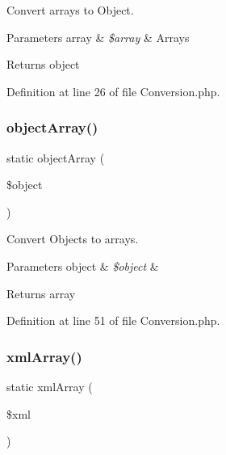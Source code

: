 Convert arrays to Object.


\begin{DoxyParams}[1]{Parameters}
array & {\em \$array} & Arrays\\
\hline
\end{DoxyParams}
\begin{DoxyReturn}{Returns}
object 
\end{DoxyReturn}


Definition at line 26 of file Conversion.\+php.

\mbox{\label{class_zest_1_1_data_1_1_conversion_a21e1e27817766782daea50d438f6a310}} 
\subsubsection{\texorpdfstring{object\+Array()}{objectArray()}}
{\footnotesize\ttfamily static object\+Array (\begin{DoxyParamCaption}\item[{}]{\$object }\end{DoxyParamCaption})\hspace{0.3cm}{\ttfamily [static]}}

Convert Objects to arrays.


\begin{DoxyParams}[1]{Parameters}
object & {\em \$object} & \\
\hline
\end{DoxyParams}
\begin{DoxyReturn}{Returns}
array 
\end{DoxyReturn}


Definition at line 51 of file Conversion.\+php.

\mbox{\label{class_zest_1_1_data_1_1_conversion_aed89a7cce16c2f0dbf0552383cec7394}} 
\subsubsection{\texorpdfstring{xml\+Array()}{xmlArray()}}
{\footnotesize\ttfamily static xml\+Array (\begin{DoxyParamCaption}\item[{}]{\$xml }\end{DoxyParamCaption})\hspace{0.3cm}{\ttfamily [static]}}

